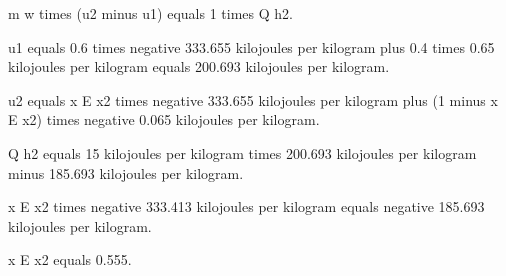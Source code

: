 m w times (u2 minus u1) equals 1 times Q h2.

u1 equals 0.6 times negative 333.655 kilojoules per kilogram plus 0.4 times 0.65 kilojoules per kilogram equals 200.693 kilojoules per kilogram.

u2 equals x E x2 times negative 333.655 kilojoules per kilogram plus (1 minus x E x2) times negative 0.065 kilojoules per kilogram.

Q h2 equals 15 kilojoules per kilogram times 200.693 kilojoules per kilogram minus 185.693 kilojoules per kilogram.

x E x2 times negative 333.413 kilojoules per kilogram equals negative 185.693 kilojoules per kilogram.

x E x2 equals 0.555.